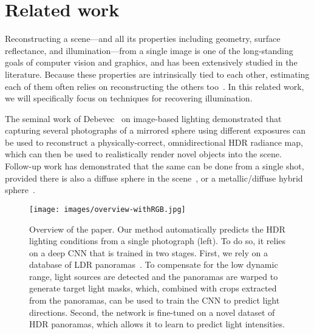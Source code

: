 \section{Related work}

Reconstructing a scene---and all its properties including geometry, surface reflectance, and illumination---from a single image is one of the long-standing goals of computer vision and graphics, and has been extensively studied in the literature. Because these properties are intrinsically tied to each other, estimating each of them often relies on reconstructing the others too~\cite{barron-pami-15}. In this related work, we will specifically focus on techniques for recovering illumination.

The seminal work of Debevec~ on image-based lighting demonstrated that capturing several photographs of a mirrored sphere using different exposures can be used to reconstruct a physi\-cally-correct, omnidirectional HDR radiance map, which can then be used to realistically render novel objects into the scene. Follow-up work has demonstrated that the same can be done from a single shot, provided there is also a diffuse sphere in the scene~\cite{reinhard-book-10}, or a metallic/diffuse hybrid sphere~\cite{debevec-sslp-12}.  


\begin{figure*}[!t]
\texttt{[image: images/overview-withRGB.jpg]}
\caption{Overview of the paper. Our method automatically predicts the HDR lighting conditions from a single photograph (left). To do so, it relies on a deep CNN that is trained in two stages. First, we rely on a database of LDR panoramas~\cite{xiao-cvpr-12}. To compensate for the low dynamic range, light sources are detected and the panoramas are warped to generate target light masks, which, combined with crops extracted from the panoramas, can be used to train the CNN to predict light directions. Second, the network is fine-tuned on a novel dataset of HDR panoramas, which allows it to learn to predict light intensities.}
\label{f:overview}
\end{figure*}

